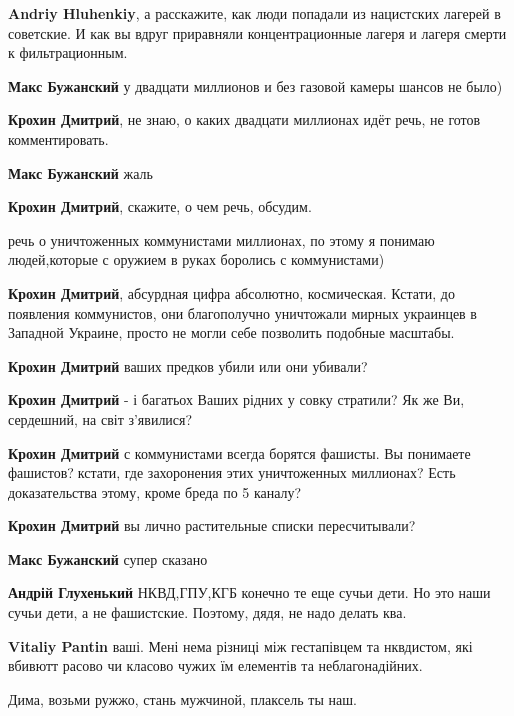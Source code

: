 \begin{itemize}
\begin{itemize}

\textbf{Andriy Hluhenkiy}, а расскажите, как люди попадали из нацистских
лагерей в советские.  И как вы вдруг приравняли концентрационные лагеря и
лагеря смерти к фильтрационным.

\textbf{Макс Бужанский} у двадцати миллионов и без газовой камеры шансов не было)

\textbf{Крохин Дмитрий}, не знаю, о каких двадцати миллионах идёт речь, не готов комментировать.

\textbf{Макс Бужанский} жаль

\textbf{Крохин Дмитрий}, скажите, о чем речь, обсудим.

речь о уничтоженных коммунистами миллионах, по этому я понимаю людей,которые с оружием в руках боролись с коммунистами)

\textbf{Крохин Дмитрий}, абсурдная цифра абсолютно, космическая.  Кстати, до
появления коммунистов, они благополучно уничтожали мирных украинцев в Западной
Украине, просто не могли себе позволить подобные масштабы.

\textbf{Крохин Дмитрий} ваших предков убили или они убивали?

\textbf{Крохин Дмитрий} - і багатьох Ваших рідних у совку стратили? Як же Ви, сердешний, на світ з'явилися?

\textbf{Крохин Дмитрий} с коммунистами всегда борятся фашисты. Вы понимаете
фашистов?👏кстати, где захоронения этих уничтоженных миллионах? Есть
доказательства этому, кроме бреда по 5 каналу?

\textbf{Крохин Дмитрий} вы лично растительные списки пересчитывали?

\textbf{Макс Бужанский} супер сказано

\textbf{Андрій Глухенький} НКВД,ГПУ,КГБ конечно те еще сучьи дети. Но это наши
сучьи дети, а не фашистские. Поэтому, дядя, не надо делать ква.

\textbf{Vitaliy Pantin} ваші. Мені нема різниці між гестапівцем та нквдистом, які вбивютт расово чи класово чужих їм елементів та неблагонадійних.

Дима, возьми ружжо, стань мужчиной, плаксель ты наш.



\end{itemize}
\end{itemize}
